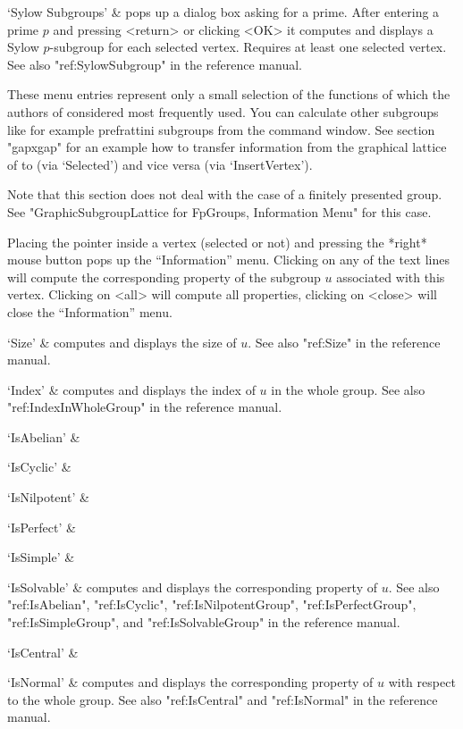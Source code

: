 `Sylow Subgroups' &
pops  up a dialog  box asking   for a prime.   After entering  a  prime $p$ 
and pressing  <return> or  clicking  <OK> it computes   and displays  a Sylow
$p$-subgroup  for   each selected vertex.  Requires   at   least one selected
vertex.  See also "ref:SylowSubgroup" in the {\GAP}
reference manual.
\enditems

These menu entries represent only a small selection of the functions of
{\GAP} which the authors of {\XGAP} considered most frequently used. You
can calculate other subgroups like for example prefrattini subgroups from
the {\GAP} command window. See section "gapxgap" for an example how to
transfer information from the graphical lattice of {\XGAP} to {\GAP} (via
`Selected') and vice versa (via `InsertVertex').


Note that this section does not deal with the case of a finitely presented
group. See "GraphicSubgroupLattice for FpGroups, Information Menu" for this 
case.

Placing the pointer  inside a vertex (selected  or not)  and pressing the
*right* mouse button pops up the  ``Information'' menu.  Clicking on any of
the text  lines will compute  the corresponding  property of the subgroup
$u$ associated  with  this vertex.  Clicking   on <all> will  compute all
properties, clicking on <close> will close the ``Information'' menu.

\beginitems
`Size' &
computes and displays the size of $u$.  See also "ref:Size" in the
{\GAP} reference manual.

`Index' &
computes and displays the  index  of $u$ in   the whole group.  See  also
"ref:IndexInWholeGroup" in the {\GAP} reference manual.

`IsAbelian' &

`IsCyclic' &

`IsNilpotent' &

`IsPerfect' &

`IsSimple' &

`IsSolvable' &
computes and displays the corresponding property of $u$.  See also
"ref:IsAbelian", "ref:IsCyclic", "ref:IsNilpotentGroup", "ref:IsPerfectGroup",
"ref:IsSimpleGroup", and "ref:IsSolvableGroup"  in the {\GAP}
reference manual.

`IsCentral' &

`IsNormal' &
computes and displays the corresponding  property of $u$ with respect  to
the whole group.  See also "ref:IsCentral" and "ref:IsNormal" in the {\GAP}
reference manual.

